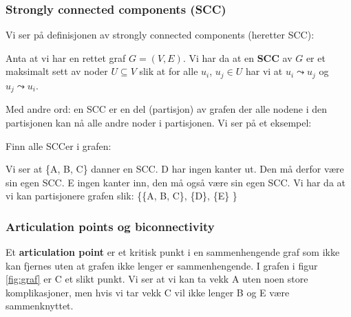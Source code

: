 \subsubsection{Strongly connected components (SCC)}
Vi ser på definisjonen av strongly connected components (heretter SCC): 
\begin{definisjon}
Anta at vi har en rettet graf $ G = (V, E) $. Vi har da at en \textbf{SCC} av $ G $ er et maksimalt sett av noder $ U \subseteq V $ slik at for alle $ u_i $, $ u_j \in U $ har vi at $ u_i \leadsto u_j $ og $ u_j \leadsto u_i $.
\end{definisjon}

Med andre ord: en SCC er en del (partisjon) av grafen der alle nodene i den partisjonen kan nå alle andre noder i partisjonen. Vi ser på et eksempel: 

\begin{eks} Finn alle SCCer i grafen:
\begin{figure}[H]
\centering
{}
\end{figure}
Vi ser at \{A, B, C\} danner en SCC. D har ingen kanter ut. Den må derfor være sin egen SCC. E ingen kanter inn, den må også være sin egen SCC. Vi har da at vi kan partisjonere grafen slik: \{\{A, B, C\}, \{D\}, \{E\} \}
\end{eks}

\subsubsection{Articulation points og biconnectivity}
Et \textbf{articulation point} er et kritisk punkt i en sammenhengende graf som ikke kan fjernes uten at grafen ikke lenger er sammenhengende. I grafen i figur \ref{fig:graf} er C et slikt punkt. Vi ser at vi kan ta vekk A uten noen store komplikasjoner, men hvis vi tar vekk C vil ikke lenger B og E være sammenknyttet.

